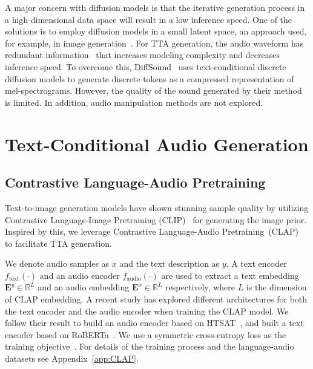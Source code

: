 \documentclass{article}
\begin{document}
A major concern with diffusion models is that the iterative generation process in a high-dimensional data space will result in a low inference speed. One of the solutions is to employ diffusion models in a small latent space, an approach used, for example, in image generation~\cite{LSGM, D2C, rombach2022high}. For TTA generation, the audio waveform has redundant information~\cite{liu2022simple, liu2022learning} that increases modeling complexity and decreases inference speed. To overcome this, DiffSound~\cite{yang2022diffsound} uses text-conditional discrete diffusion models to generate discrete tokens as a compressed representation of mel-spectrograms. However, the quality of the sound generated by their method is limited. In addition, audio manipulation methods are not explored. 




\section{Text-Conditional Audio Generation}
\label{AudioLDM}





\subsection{Contrastive Language-Audio Pretraining}
\label{CLAP}
Text-to-image generation models have shown stunning sample quality by utilizing Contrastive Language-Image Pretraining (CLIP)~\cite{CLIP} for generating the image prior. Inspired by this, we leverage Contrastive Language-Audio Pretraining~(CLAP)~\cite{wu2022large} to facilitate TTA generation.   

We denote audio samples as $x$ and the text description as $y$. A text encoder $f_{\text{text}}(\cdot)$ and an audio encoder $f_{\text{audio}}(\cdot)$ are used to extract a text embedding $\boldsymbol{E}^{y}\in \mathbb{R}^{L}$ and an audio embedding $\boldsymbol{E}^{x}\in \mathbb{R}^{L}$ respectively, where $L$ is the dimension of CLAP embedding. A recent study \cite{wu2022large} has explored different architectures for both the text encoder and the audio encoder when training the CLAP model. We follow their result to build an audio encoder based on HTSAT~\cite{HTSAT}, and built a text encoder based on RoBERTa~\cite{RoBERTa}. We use a symmetric cross-entropy loss as the training objective~\cite{CLIP,wu2022large}. For details of the training process and the language-audio datasets see Appendix~\ref{app:CLAP}. 
\end{document}

